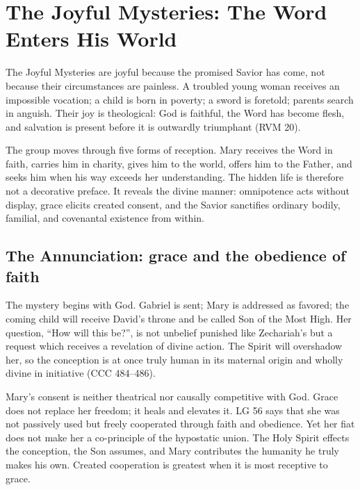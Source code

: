 \section{The Joyful Mysteries: The Word Enters His World}

The Joyful Mysteries are joyful because the promised Savior has come, not because their circumstances are painless. A troubled young woman receives an impossible vocation; a child is born in poverty; a sword is foretold; parents search in anguish. Their joy is theological: God is faithful, the Word has become flesh, and salvation is present before it is outwardly triumphant (RVM 20).

The group moves through five forms of reception. Mary receives the Word in faith, carries him in charity, gives him to the world, offers him to the Father, and seeks him when his way exceeds her understanding. The hidden life is therefore not a decorative preface. It reveals the divine manner: omnipotence acts without display, grace elicits created consent, and the Savior sanctifies ordinary bodily, familial, and covenantal existence from within.

\subsection{The Annunciation: grace and the obedience of faith}


The mystery begins with God. Gabriel is sent; Mary is addressed as favored; the coming child will receive David's throne and be called Son of the Most High. Her question, ``How will this be?'', is not unbelief punished like Zechariah's but a request which receives a revelation of divine action. The Spirit will overshadow her, so the conception is at once truly human in its maternal origin and wholly divine in initiative (CCC 484--486).

Mary's consent is neither theatrical nor causally competitive with God. Grace does not replace her freedom; it heals and elevates it. LG 56 says that she was not passively used but freely cooperated through faith and obedience. Yet her fiat does not make her a co-principle of the hypostatic union. The Holy Spirit effects the conception, the Son assumes, and Mary contributes the humanity he truly makes his own. Created cooperation is greatest when it is most receptive to grace.

